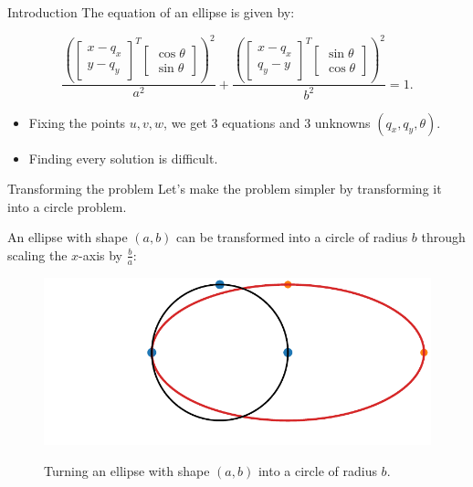\documentclass{beamer}
\begin{document}
\begin{frame}{Introduction}
	The equation of an ellipse is given by:
	
	\begin{equation*}
	\frac{\left(\left[\begin{array}{c}
	x-q_x\\
	y-q_y
		\end{array}\right]^T
		\left[\begin{array}{c}
		\cos\theta\\
		\sin\theta
		\end{array}\right]
		\right)^2}{a^2}+\frac{\left(\left[\begin{array}{c}
		x-q_x\\
		q_y-y
		\end{array}\right]^T
		\left[\begin{array}{c}
		\sin\theta\\
		\cos\theta
		\end{array}\right]
		\right)^2}{b^2} = 1.
	\end{equation*}
	
	\begin{itemize}
		\item Fixing the points $u, v, w$, we get $3$ equations and $3$ unknowns $(q_x, q_y, \theta)$.
		\item Finding every solution is difficult.
	\end{itemize}
\end{frame}

\begin{frame}{Transforming the problem}
	Let's make the problem simpler by transforming it into a circle problem.
	
	An ellipse with shape $(a, b)$ can be transformed into a circle of radius $b$ through scaling the $x$-axis by $\frac{b}{a}$:
	\begin{figure}
		\centering
		
		\includegraphics[scale=.5]{el1.pdf}
		\label{fig:el1}
		\caption{Turning an ellipse with shape $(a, b)$ into a circle of radius $b$.}
	\end{figure}
	
\end{frame}
\end{document}
